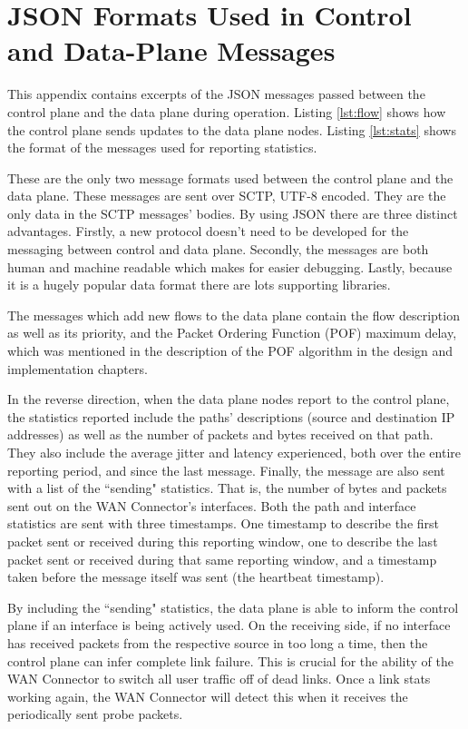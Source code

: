 

\cleardoublepage
\chapter{JSON Formats Used in Control and Data-Plane Messages}
\label{appendix:format}

This appendix contains excerpts of the JSON messages passed between the control plane and the data plane during operation. Listing \ref{lst:flow} shows how the control plane sends updates to the data plane nodes. Listing \ref{lst:stats} shows the format of the messages used for reporting statistics.

These are the only two message formats used between the control plane and the data plane. These messages are sent over SCTP, UTF-8 encoded. They are the only data in the SCTP messages' bodies. By using JSON there are three distinct advantages. Firstly, a new protocol doesn't need to be developed for the messaging between control and data plane. Secondly, the messages are both human and machine readable which makes for easier debugging. Lastly, because it is a hugely popular data format there are lots supporting libraries. 

The messages which add new flows to the data plane contain the flow description as well as its priority, and the Packet Ordering Function (POF) maximum delay, which was mentioned in the description of the POF algorithm in the design and implementation chapters.

In the reverse direction, when the data plane nodes report to the control plane, the statistics reported include the paths' descriptions (source and destination IP addresses) as well as the number of packets and bytes received on that path. They also include the average jitter and latency experienced, both over the entire reporting period, and since the last message. Finally, the message are also sent with a list of the “sending" statistics. That is, the number of bytes and packets sent out on the WAN Connector's interfaces. Both the path and interface statistics are sent with three timestamps. One timestamp to describe the first packet sent or received during this reporting window, one to describe the last packet sent or received during that same reporting window, and a timestamp taken before the message itself was sent (the heartbeat timestamp).

By including the “sending" statistics, the data plane is able to inform the control plane if an interface is being actively used. On the receiving side, if no interface has received packets from the respective source in too long a time, then the control plane can infer complete link failure. This is crucial for the ability of the WAN Connector to switch all user traffic off of dead links. Once a link stats working again, the WAN Connector will detect this when it receives the periodically sent probe packets.

